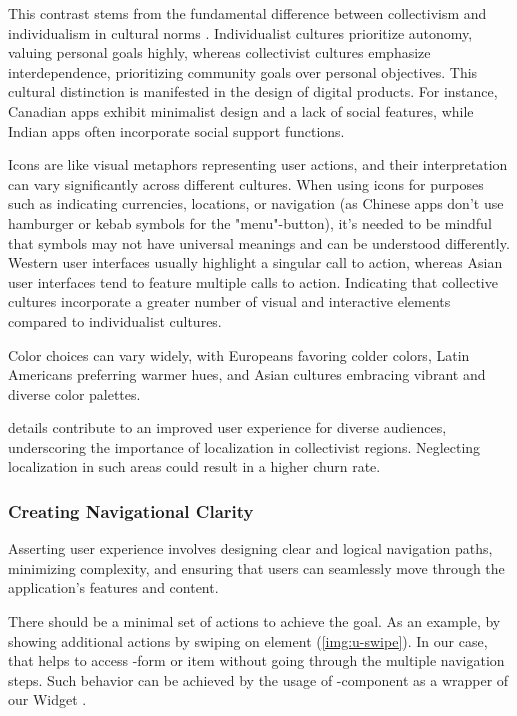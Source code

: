 This contrast stems from the fundamental difference between collectivism and individualism in cultural norms 
\cite{Wall23}. Individualist cultures prioritize autonomy, valuing personal goals highly, whereas collectivist cultures 
emphasize interdependence, prioritizing community goals over personal objectives. This cultural distinction is 
manifested in the design of digital products. For instance, Canadian apps exhibit minimalist design and a lack of social 
features, while Indian apps often incorporate social support functions.

Icons are like visual metaphors representing user actions, and their interpretation can vary significantly across 
different cultures. When using icons for purposes such as indicating currencies, locations, or navigation (as Chinese 
apps don't use hamburger or kebab symbols for the "menu"-button), it's needed to be mindful that symbols may not have 
universal meanings and can be understood differently. Western user interfaces usually highlight a singular call to 
action, whereas Asian user interfaces tend to feature multiple calls to action. Indicating that collective cultures
incorporate a greater number of visual and interactive elements compared to individualist cultures.

Color choices can vary widely, with Europeans favoring colder colors, Latin Americans preferring warmer hues, and Asian 
cultures embracing vibrant and diverse color palettes.


\noindentThese details \cite{Rein14} contribute to an improved user experience for diverse audiences, underscoring the 
importance of localization in collectivist regions. Neglecting localization in such areas could result in a higher 
churn rate.


\subsubsection{Creating Navigational Clarity} 

Asserting user experience involves designing clear and logical navigation paths, minimizing complexity, and ensuring 
that users can seamlessly move through the application's features and content.

There should be a minimal set of actions to achieve the goal. As an example, by showing additional actions by swiping 
on element (\cref{img:u-swipe}). In our case, that helps to access -form or  item without going 
through the multiple navigation steps. Such behavior can be achieved by the usage of 
-component as a wrapper of our Widget .

